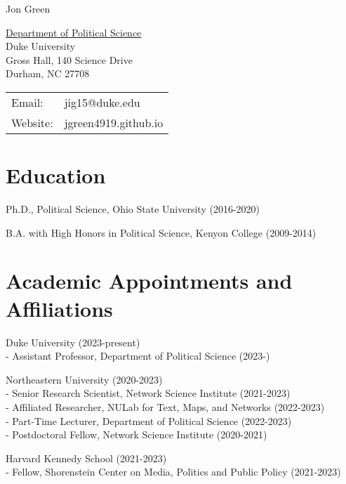 \documentclass[letterpaper]{article}
\def\name{Jon Green}
\renewenvironment{itemize}{
  \begin{list}{}{
    \setlength{\leftmargin}{1.5em}
  }
}{
  \end{list}
}
\begin{document}
{\huge \name}


\vspace{0.25in}

\begin{minipage}{0.45\linewidth}
  \href{https://polisci.duke.edu//}{Department of Political Science} \\
    Duke University \\
    Gross Hall, 140 Science Drive\\
  Durham, NC 27708
\end{minipage}
\begin{minipage}{0.45\linewidth}
  \begin{tabular}{ll}
    Email: & jig15@duke.edu \\
    Website: & jgreen4919.github.io \\
  \end{tabular}
\end{minipage}

\section*{Education}

\begin{itemize}
    \item Ph.D., Political Science, Ohio State University (2016-2020)
	\item B.A. with High Honors in Political Science, Kenyon College (2009-2014)
\end{itemize}

\section*{Academic Appointments and Affiliations}
\begin{itemize}

\item Duke University (2023-present) \\
- Assistant Professor, Department of Political Science (2023-)

\item Northeastern University (2020-2023) \\
- Senior Research Scientist, Network Science Institute (2021-2023)\\
- Affiliated Researcher, NULab for Text, Maps, and Networks (2022-2023) \\
- Part-Time Lecturer, Department of Political Science (2022-2023)\\
- Postdoctoral Fellow, Network Science Institute  (2020-2021)

\item Harvard Kennedy School  (2021-2023) \\
- Fellow, Shorenstein Center on Media, Politics and Public Policy (2021-2023)
\end{itemize}
\end{document}
